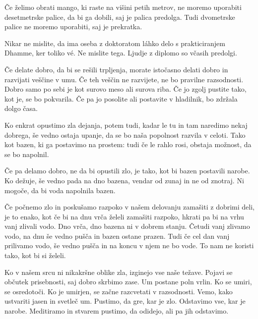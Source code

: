 \clearpage


Če želimo obrati mango, ki raste na višini petih metrov, ne moremo uporabiti desetmetrske palice, da bi ga dobili, saj je palica predolga. Tudi dvometrske palice ne moremo uporabiti, saj je prekratka.

Nikar ne mislite, da ima oseba z doktoratom láhko delo s prakticiranjem Dhamme, ker toliko vé. Ne mislite tega. Ljudje z diplomo so včasih predolgi.


Če delate dobro, da bi se rešili trpljenja, morate istočasno delati dobro in razvijati veščine v umu. Če teh veščin ne razvijete, ne bo pravilne  razsodnosti. Dobro samo po sebi je kot surovo meso ali surova riba. Če jo zgolj pustite tako, kot je, se bo pokvarila. Če pa jo posolite ali postavite v hladilnik, bo zdržala dolgo časa.

\clearpage


Ko enkrat opustimo zla dejanja, potem tudi, kadar le tu in tam naredimo nekaj dobrega, še vedno ostaja upanje, da se bo naša popolnost razvila v celoti. Tako kot bazen, ki ga postavimo na prostem: tudi če le rahlo rosi, obstaja možnost, da se bo napolnil.

Če pa delamo dobro, ne da bi opustili zlo, je tako, kot bi bazen postavili narobe. Ko dežuje, še vedno pada na dno bazena, vendar od zunaj in ne od znotraj. Ni mogoče, da bi voda napolnila bazen.


Če počnemo zlo in poskušamo razpoko v našem delovanju zamašiti z dobrimi deli, je to enako, kot če bi na dnu vrča želeli zamašiti razpoko, hkrati pa bi na vrhu vanj zlivali vodo. Dno vrča, dno bazena ni v dobrem stanju. Četudi vanj zlivamo vodo, na dnu še vedno pušča in bazen ostane prazen. Tudi če cel dan vanj prilivamo vodo, še vedno pušča in na koncu v njem ne bo vode. To nam ne koristi tako, kot bi si želeli.

\clearpage


Ko v našem srcu ni nikakršne oblike zla, izginejo vse naše težave. Pojavi se občutek prisebnosti, saj dobro skrbimo zase. Um postane poln vrlin. Ko se umiri, se osredotoči. Ko je umirjen, se začne razcvetati v razsodnosti. Vemo, kako ustvariti jasen in svetleč um. Pustimo, da gre, kar je zlo. Odstavimo vse, kar je narobe. Meditiramo in stvarem pustimo, da odidejo, ali pa jih odstavimo.

